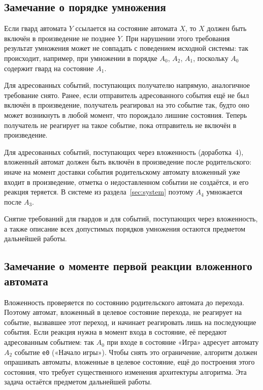 \documentclass[12pt]{article}
\begin{document}
\subsection*{Замечание о порядке умножения}

Если гвард автомата $Y$ ссылается на состояние автомата $X$, то $X$ должен
быть включён в произведение не позднее $Y$. При нарушении этого требования
результат умножения может не совпадать с поведением исходной системы: так
происходит, например, при умножении в порядке $A_0$, $A_2$, $A_1$,
поскольку $A_0$ содержит гвард на состояние $A_1$.

Для адресованных событий, поступающих получателю напрямую, аналогичное
требование снято. Ранее, если отправитель адресованного события ещё не был
включён в произведение, получатель реагировал на это событие так, будто
оно может возникнуть в любой момент, что порождало лишние состояния.
Теперь получатель не реагирует на такое событие, пока отправитель не
включён в произведение.

Для адресованных событий, поступающих через вложенность (доработка~4),
вложенный автомат должен быть включён в произведение после родительского:
иначе на момент доставки события родительскому автомату вложенный уже
входит в произведение, отметка о недоставленном событии не создаётся, и
его реакция теряется. В системе из раздела~\ref{sec:system} поэтому $A_4$
умножается после $A_3$.

Снятие требований для гвардов и для событий, поступающих через
вложенность, а также описание всех допустимых порядков умножения остаются
предметом дальнейшей работы.

\subsection*{Замечание о моменте первой реакции вложенного автомата}

Вложенность проверяется по состоянию родительского автомата до перехода.
Поэтому автомат, вложенный в целевое состояние перехода, не реагирует на
событие, вызвавшее этот переход, и начинает реагировать лишь на
последующие события. Если реакция нужна в момент входа в состояние, её
передают адресованным событием: так $A_0$ при входе в состояние «Игра»
адресует автомату $A_2$ событие \texttt{e0} («Начало игры»). Чтобы снять
это ограничение, алгоритм должен опрашивать автоматы, вложенные в целевое
состояние, ещё до построения этого состояния, что требует существенного
изменения архитектуры алгоритма. Эта задача остаётся предметом дальнейшей
работы.
\end{document}
